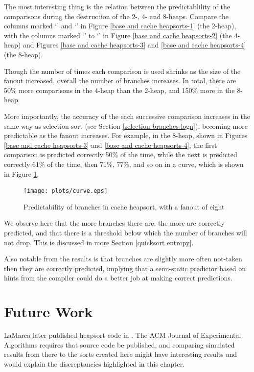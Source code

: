 The most interesting thing is the relation between the predictablility of the
comparisons during the destruction of the 2-, 4- and 8-heaps. Compare the
columns marked `' and `' in Figure \ref{base and cache heapsorts-1} (the 2-heap), with the
columns marked `' to `' in Figure \ref{base and
cache heapsorts-2} (the 4-heap) and Figures \ref{base and cache heapsorts-3} and
\ref{base and cache heapsorts-4} (the 8-heap).

Though the number of times each comparison is used shrinks
as the size of the fanout increased, overall the number of branches increases.
In total, there are 50\% more comparisons in the 4-heap than the 2-heap, and
150\% more in the 8-heap.

More importantly, the accuracy of the each
successive comparison increases in the same way as selection sort (see Section
\ref{selection branches logn}), becoming more predictable as the fanout
increases. For example, in the 8-heap, shown in Figures \ref{base and cache heapsorts-3}
and \ref{base and cache heapsorts-4},
the first comparison is predicted correctly 50\% of the
time, while the next is predicted correctly 61\% of the time, then 71\%, 77\%, and
so on in a curve, which is shown in Figure \ref{cache heapsort curve}.

\begin{figure}
\texttt{[image: plots/curve.eps]}
\caption{Predictability of branches in cache heapsort, with a fanout of eight}
\label{cache heapsort curve}
\end{figure}

\label{heapsort entropy}
We observe here that the more branches there are, the more are correctly
predicted, and that there is a threshold below which the number of branches will
not drop. This is discussed in more Section \ref{quicksort entropy}.

Also notable from the results is that branches are slightly more often not-taken
then they are correctly predicted, implying that a semi-static predictor based
on hints from the compiler could do a better job at making correct predictions.

\section{Future Work}

LaMarca later published heapsort code in \cite{LaMarcaHeap96}. The ACM
Journal of Experimental Algorithms requires that source code be published, and
comparing simulated results from there to the sorts created here might have
interesting results and would explain the discreptancies highlighted in this
chapter.
